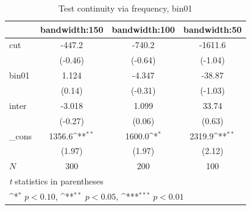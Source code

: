 \documentclass[a4paper,11pt]{article}
\begin{document}
\begin{table}[htbp]\centering
\def\sym#1{\ifmmode^{#1}\else\(^{#1}\)\fi}
\caption{Test continuity via frequency, bin01}
\label{A2.bin01}
\begin{tabular}{l*{3}{c}}
\hline\hline
            &\multicolumn{1}{c}{bandwidth:150}&\multicolumn{1}{c}{bandwidth:100}&\multicolumn{1}{c}{bandwidth:50}\\
\hline
cut         &      -447.2         &      -740.2         &     -1611.6         \\
            &     (-0.46)         &     (-0.64)         &     (-1.04)         \\
[1em]
bin01       &       1.124         &      -4.347         &      -38.87         \\
            &      (0.14)         &     (-0.31)         &     (-1.03)         \\
[1em]
inter       &      -3.018         &       1.099         &       33.74         \\
            &     (-0.27)         &      (0.06)         &      (0.63)         \\
[1em]
\_cons      &      1356.6\sym{**} &      1600.0\sym{*}  &      2319.9\sym{**} \\
            &      (1.97)         &      (1.97)         &      (2.12)         \\
\hline
\(N\)       &         300         &         200         &         100         \\
\hline\hline
\multicolumn{4}{l}{\footnotesize \textit{t} statistics in parentheses}\\
\multicolumn{4}{l}{\footnotesize \sym{*} \(p<0.10\), \sym{**} \(p<0.05\), \sym{***} \(p<0.01\)}\\
\end{tabular}
\end{table}


\end{document}
